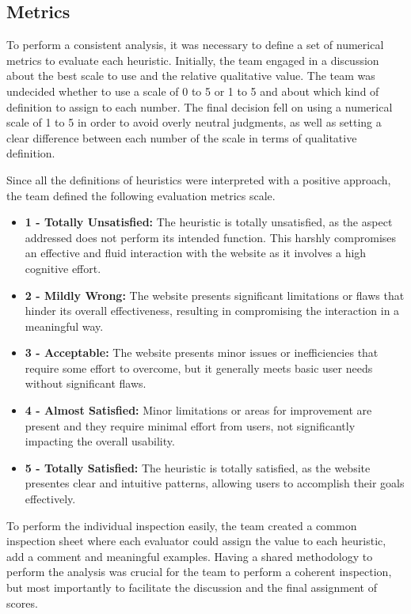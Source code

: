 
\subsection{Metrics}

To perform a consistent analysis, it was necessary to define a set of numerical metrics to evaluate each heuristic.
Initially, the team engaged in a discussion about the best scale to use and the relative qualitative value. The team was undecided whether to use a scale of 0 to 5 or 1 to 5 and about which kind of definition to assign to each number.
The final decision fell on using a numerical scale of 1 to 5 in order to avoid overly neutral judgments, as well as setting a clear difference between each number of the scale in terms of qualitative definition. 

Since all the definitions of heuristics were interpreted with a positive approach, the team defined the following evaluation metrics scale.
\begin{itemize}
    \item \textbf{1 - Totally Unsatisfied:} The heuristic is totally unsatisfied, as the aspect addressed does not perform its intended function. This harshly compromises an effective and fluid interaction with the website as it involves a high cognitive effort.
    \item \textbf{2 - Mildly Wrong:} The website presents significant limitations or flaws that hinder its overall effectiveness, resulting in compromising the interaction in a meaningful way.
    \item \textbf{3 - Acceptable:} The website presents minor issues or inefficiencies that require some effort to overcome, but it generally meets basic user needs without significant flaws.
    \item \textbf{4 - Almost Satisfied:} Minor limitations or areas for improvement are present and they require minimal effort from users, not significantly impacting the overall usability.
    \item \textbf{5 - Totally Satisfied:} The heuristic is totally satisfied, as the website presentes clear and intuitive patterns, allowing users to accomplish their goals effectively.
\end{itemize}

To perform the individual inspection easily, the team created a common inspection sheet where each evaluator could assign the value to each heuristic, add a comment and meaningful examples. Having a shared methodology to perform the analysis was crucial for the team to perform a coherent inspection, but most importantly to facilitate the discussion and the final assignment of scores.